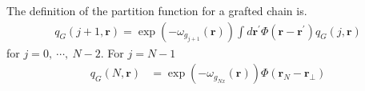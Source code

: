 \documentclass{article}
\begin{document}
    \noindent 
    The definition of the partition function for a grafted chain is. 
      \begin{align*}
    q_G(j+1, \mathbf{r}) = \exp(-\omega_{g_{j+1}}(\mathbf{r}))
      \int d \mathbf{r}^\prime \Phi(\mathbf{r} - \mathbf{r}^\prime)
      q_G(j, \mathbf{r})  
  \end{align*}
  for $j=0,\ \cdots,\ N-2$. For $j=N-1$
  \begin{align*}
    q_G(N, \mathbf{r}) 
    &=
    \exp(-\omega_{g_{Nx}}(\mathbf{r})) 
    \Phi(\mathbf{r}_N - \mathbf{r}_\perp)
  \end{align*}


\end{document}
